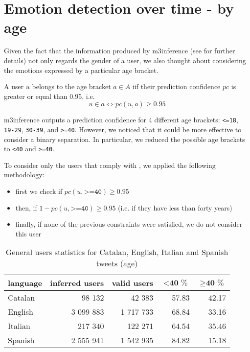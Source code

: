 \section{Emotion detection over time - by age}
\label{sec:emotion-by-age}

Given the fact that the information produced by m3inference (see  for further details) not only regards the gender of a user, we also thought about considering the emotions expressed by a particular age bracket.

\begin{definition}
\label{def:valid-users-age}
	A user \(u\) belongs to the age bracket \(a \in A\) iif their prediction confidence \(pc\) is greater or equal than 0.95, i.e.
	\[u \in a \Longleftrightarrow pc(u, a) \geq 0.95\]
\end{definition}

m3inference outputs a prediction confidence for 4 different age brackets: \texttt{<=18}, \texttt{19-29}, \texttt{30-39}, and \texttt{>=40}. However, we noticed that it could be more effective to consider a binary separation. In particular, we reduced the possible age brackets to \texttt{<40} and \texttt{>=40}.

To consider only the users that comply with , we applied the following methodology:

\begin{itemize}
	\item first we check if \(pc(u, \texttt{>=40}) \geq 0.95\)
	\item then, if \(1 - pc(u, \texttt{>=40}) \geq 0.95\) (i.e. if they have less than forty years)
	\item finally, if none of the previous constraints were satisfied, we do not consider this user
\end{itemize}

\begin{table}[h]
	\centering
	\begin{tabular}{lrrrr}
		\toprule
		\textbf{language} & \textbf{inferred users} & \textbf{valid users} & \(< \textbf{40 \%}\) & \(\geq \textbf{40 \%}\) 
		\\
		\midrule
		Catalan & 98 132 & 42 383 & 57.83 & 42.17
		\\
		English & 3 099 883 & 1 717 733 & 68.84 & 33.16 
		\\
		Italian & 217 340 & 122 271 & 64.54 & 35.46 
		\\
		Spanish & 2 555 941 & 1 542 935 & 84.82 & 15.18
		\\
		\bottomrule
	\end{tabular}
	\caption{General users statistics for Catalan, English, Italian and Spanish tweets (age)}
	\label{tab:users-age}
\end{table}

